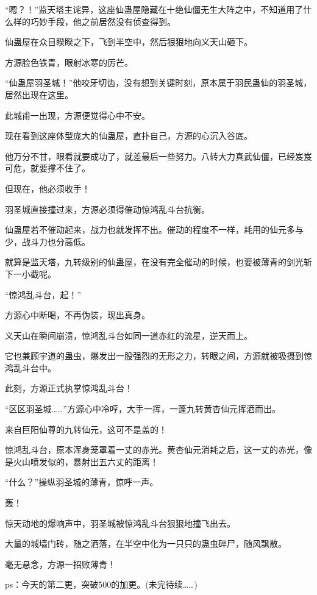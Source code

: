 \begin{this_body}
“嗯？！”监天塔主诧异，这座仙蛊屋隐藏在十绝仙僵无生大阵之中，不知道用了什么样的巧妙手段，他之前居然没有侦查得到。

仙蛊屋在众目睽睽之下，飞到半空中，然后狠狠地向义天山砸下。

方源脸色铁青，眼射冰寒的厉芒。

“仙蛊屋羽圣城！”他咬牙切齿，没有想到关键时刻，原本属于羽民蛊仙的羽圣城，居然出现在这里。

此城甫一出现，方源便觉得心中不安。

现在看到这座体型庞大的仙蛊屋，直扑自己，方源的心沉入谷底。

他万分不甘，眼看就要成功了，就差最后一些努力。八转大力真武仙僵，已经岌岌可危，就要撑不住了。

但现在，他必须收手！

羽圣城直接撞过来，方源必须得催动惊鸿乱斗台抗衡。

仙蛊屋若不催动起来，战力也就发挥不出。催动的程度不一样，耗用的仙元多与少，战斗力也分高低。

就算是监天塔，九转级别的仙蛊屋，在没有完全催动的时候，也要被薄青的剑光斩下一小截呢。

“惊鸿乱斗台，起！”

方源心中断喝，不再伪装，现出真身。

义天山在瞬间崩溃，惊鸿乱斗台如同一道赤红的流星，逆天而上。

它也兼顾宇道的蛊虫，爆发出一股强烈的无形之力，转眼之间，方源就被吸摄到惊鸿乱斗台中。

此刻，方源正式执掌惊鸿乱斗台！

“区区羽圣城……”方源心中冷哼，大手一挥，一蓬九转黄杏仙元挥洒而出。

来自巨阳仙尊的九转仙元，这可不是盖的！

惊鸿乱斗台，原本浑身笼罩着一丈的赤光。黄杏仙元消耗之后，这一丈的赤光，像是火山喷发似的，暴射出五六丈的距离！

“什么？”操纵羽圣城的薄青，惊呼一声。

轰！

惊天动地的爆响声中，羽圣城被惊鸿乱斗台狠狠地撞飞出去。

大量的城墙门砖，随之洒落，在半空中化为一只只的蛊虫碎尸，随风飘散。

毫无悬念，方源一招败薄青！

ps：今天的第二更，突破500的加更。(未完待续……)

\end{this_body}

